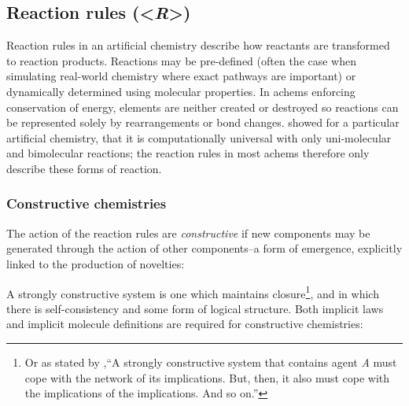 \subsection{Reaction rules (\textless{}\emph{R}\textgreater{})}

Reaction rules in an artificial chemistry describe how reactants are transformed to reaction products. Reactions may be pre-defined (often the case when simulating real-world chemistry where exact pathways are important) or dynamically determined using molecular properties. In \glspl{achem} enforcing conservation of energy, elements are neither created or destroyed so reactions can be represented solely by rearrangements or bond changes. \Textcite{Tominaga2007} showed for a particular artificial chemistry, that it is computationally universal with only uni-molecular and bimolecular reactions; the reaction rules in most \glspl{achem} therefore only describe these forms of reaction.

\subsubsection{Constructive chemistries}\label{constructive-chemistries}


The action of the reaction rules are \textit{constructive} \parencite{Fontana1994} if new components may be generated through the action of other components--a form of emergence, explicitly linked to the production of novelties: 

A strongly constructive system is one which maintains closure\footnote{Or as stated by \textcite[217]{Fontana1994},``A strongly constructive system that contains agent \emph{A} must cope with the network of its implications. But, then, it also must cope with the implications of the implications. And so on.''}, and in which there is self-consistency and some form of logical structure. Both implicit laws and implicit molecule definitions are required for constructive chemistries:

